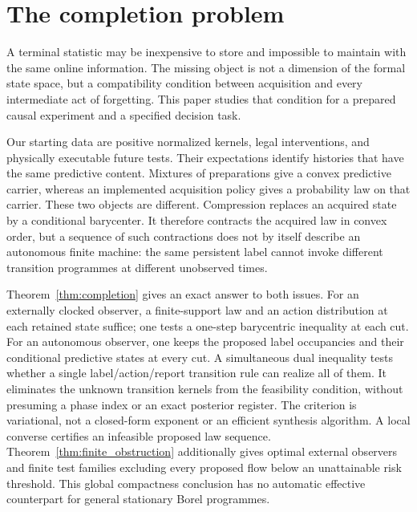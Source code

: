 \section{The completion problem}\label{sec:intro}
A terminal statistic may be inexpensive to store and impossible to maintain with the same online information. The missing object is not a dimension of the formal state space, but a compatibility condition between acquisition and every intermediate act of forgetting. This paper studies that condition for a prepared causal experiment and a specified decision task.

Our starting data are positive normalized kernels, legal interventions, and physically executable future tests. Their expectations identify histories that have the same predictive content. Mixtures of preparations give a convex predictive carrier, whereas an implemented acquisition policy gives a probability law on that carrier. These two objects are different. Compression replaces an acquired state by a conditional barycenter. It therefore contracts the acquired law in convex order, but a sequence of such contractions does not by itself describe an autonomous finite machine: the same persistent label cannot invoke different transition programmes at different unobserved times.

Theorem~\ref{thm:completion} gives an exact answer to both issues. For an externally clocked observer, a finite-support law and an action distribution at each retained state suffice; one tests a one-step barycentric inequality at each cut. For an autonomous observer, one keeps the proposed label occupancies and their conditional predictive states at every cut. A simultaneous dual inequality tests whether a single label/action/report transition rule can realize all of them. It eliminates the unknown transition kernels from the feasibility condition, without presuming a phase index or an exact posterior register. The criterion is variational, not a closed-form exponent or an efficient synthesis algorithm. A local converse certifies an infeasible proposed law sequence. Theorem~\ref{thm:finite_obstruction} additionally gives optimal external observers and finite test families excluding every proposed flow below an unattainable risk threshold. This global compactness conclusion has no automatic effective counterpart for general stationary Borel programmes.

